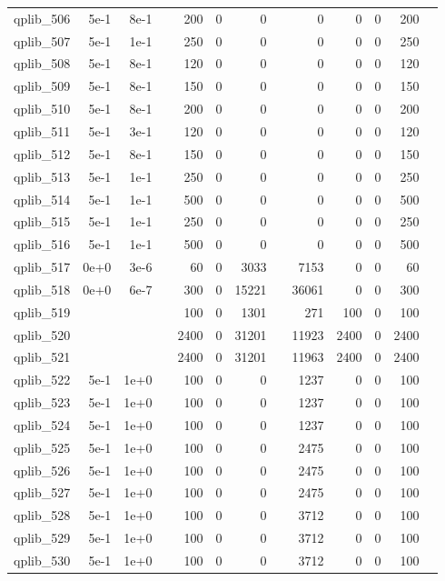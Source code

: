 \begin{table}
\begin{tabular}{lrrrrrrrrrrrr}
qplib\_506	&	5e-1	&	8e-1	&	&	200	&	0	&	0	&	&	0	&	0	&	0	&	200	\\
qplib\_507	&	5e-1	&	1e-1	&	&	250	&	0	&	0	&	&	0	&	0	&	0	&	250	\\
qplib\_508	&	5e-1	&	8e-1	&	&	120	&	0	&	0	&	&	0	&	0	&	0	&	120	\\
qplib\_509	&	5e-1	&	8e-1	&	&	150	&	0	&	0	&	&	0	&	0	&	0	&	150	\\
qplib\_510	&	5e-1	&	8e-1	&	&	200	&	0	&	0	&	&	0	&	0	&	0	&	200	\\
qplib\_511	&	5e-1	&	3e-1	&	&	120	&	0	&	0	&	&	0	&	0	&	0	&	120	\\
qplib\_512	&	5e-1	&	8e-1	&	&	150	&	0	&	0	&	&	0	&	0	&	0	&	150	\\
qplib\_513	&	5e-1	&	1e-1	&	&	250	&	0	&	0	&	&	0	&	0	&	0	&	250	\\
qplib\_514	&	5e-1	&	1e-1	&	&	500	&	0	&	0	&	&	0	&	0	&	0	&	500	\\
qplib\_515	&	5e-1	&	1e-1	&	&	250	&	0	&	0	&	&	0	&	0	&	0	&	250	\\
qplib\_516	&	5e-1	&	1e-1	&	&	500	&	0	&	0	&	&	0	&	0	&	0	&	500	\\
qplib\_517	&	0e+0	&	3e-6	&	&	60	&	0	&	3033	&	&	7153	&	0	&	0	&	60	\\
qplib\_518	&	0e+0	&	6e-7	&	&	300	&	0	&	15221	&	&	36061	&	0	&	0	&	300	\\
qplib\_519	&		&		&	&	100	&	0	&	1301	&	&	271	&	100	&	0	&	100	\\
qplib\_520	&		&		&	&	2400	&	0	&	31201	&	&	11923	&	2400	&	0	&	2400	\\
qplib\_521	&		&		&	&	2400	&	0	&	31201	&	&	11963	&	2400	&	0	&	2400	\\
qplib\_522	&	5e-1	&	1e+0	&	&	100	&	0	&	0	&	&	1237	&	0	&	0	&	100	\\
qplib\_523	&	5e-1	&	1e+0	&	&	100	&	0	&	0	&	&	1237	&	0	&	0	&	100	\\
qplib\_524	&	5e-1	&	1e+0	&	&	100	&	0	&	0	&	&	1237	&	0	&	0	&	100	\\
qplib\_525	&	5e-1	&	1e+0	&	&	100	&	0	&	0	&	&	2475	&	0	&	0	&	100	\\
qplib\_526	&	5e-1	&	1e+0	&	&	100	&	0	&	0	&	&	2475	&	0	&	0	&	100	\\
qplib\_527	&	5e-1	&	1e+0	&	&	100	&	0	&	0	&	&	2475	&	0	&	0	&	100	\\
qplib\_528	&	5e-1	&	1e+0	&	&	100	&	0	&	0	&	&	3712	&	0	&	0	&	100	\\
qplib\_529	&	5e-1	&	1e+0	&	&	100	&	0	&	0	&	&	3712	&	0	&	0	&	100	\\
qplib\_530	&	5e-1	&	1e+0	&	&	100	&	0	&	0	&	&	3712	&	0	&	0	&	100	\\

\end{tabular}
\end{table}
